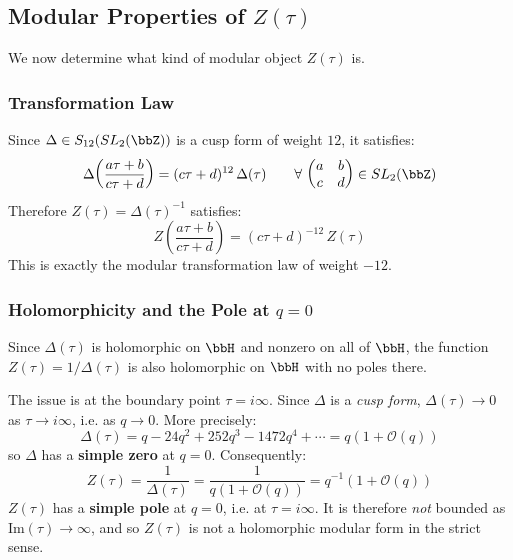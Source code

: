 \subsection{Modular Properties of $Z(\tau)$}\label{app:Modular_Properties_of_Z}

We now determine what kind of modular object $Z(\tau)$ is.

\subsubsection{Transformation Law}

Since $\Delta \in S_{12}(SL_2(\bbZ))$ is a cusp form of weight $12$, it 
satisfies:
\begin{equation}
    \Delta\!\left(\frac{a\tau+b}{c\tau+d}\right) = (c\tau+d)^{12}\,\Delta(\tau)
    \qquad \forall\,\begin{pmatrix}a&b\\c&d\end{pmatrix}\in SL_2(\bbZ)
\end{equation}
Therefore $Z(\tau) = \Delta(\tau)^{-1}$ satisfies:
\begin{equation}
    Z\!\left(\frac{a\tau+b}{c\tau+d}\right) = (c\tau+d)^{-12}\,Z(\tau)
\end{equation}
This is exactly the modular transformation law of weight $-12$.

\subsubsection{Holomorphicity and the Pole at $q=0$}
Since $\Delta(\tau)$ is holomorphic on 
$\bbH$ and nonzero on all of $\bbH$, the function $Z(\tau) = 1/\Delta(\tau)$ 
is also holomorphic on $\bbH$ with no poles there.

The issue is at the boundary point $\tau = i\infty$. Since $\Delta$ is a 
\emph{cusp form}, $\Delta(\tau) \to 0$ as $\tau \to i\infty$, i.e. as $q \to 0$. 
More precisely:
\begin{equation}
    \Delta(\tau) = q - 24q^2 + 252q^3 - 1472q^4 + \cdots = q(1 + \mathscr{O}(q))
\end{equation}
so $\Delta$ has a \textbf{simple zero} at $q=0$. Consequently:
\begin{equation}
    Z(\tau) = \frac{1}{\Delta(\tau)} = \frac{1}{q(1+\mathscr{O}(q))} 
    = q^{-1}(1 + \mathscr{O}(q))
\end{equation}
$Z(\tau)$ has a \textbf{simple pole} at $q = 0$, i.e. at $\tau = i\infty$. 
It is therefore \emph{not} bounded as $\text{Im}(\tau)\to\infty$, and so 
$Z(\tau)$ is not a holomorphic modular form in the strict sense.


